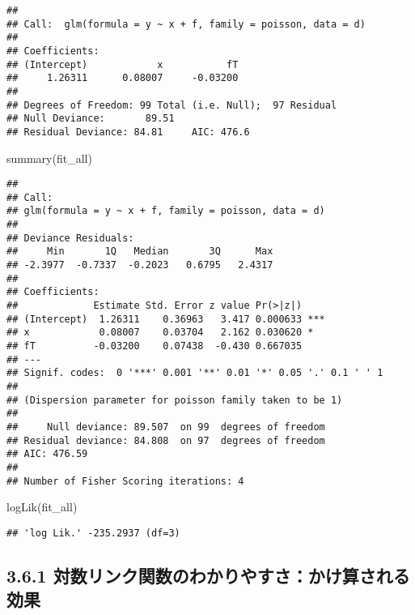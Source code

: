 \documentclass[
]{article}
\newenvironment{Shaded}{\begin{snugshade}}{\end{snugshade}}
\newcommand{\FunctionTok}[1]{\textcolor[rgb]{0.00,0.00,0.00}{#1}}
\newcommand{\NormalTok}[1]{#1}
\begin{document}
\begin{verbatim}
## 
## Call:  glm(formula = y ~ x + f, family = poisson, data = d)
## 
## Coefficients:
## (Intercept)            x           fT  
##     1.26311      0.08007     -0.03200  
## 
## Degrees of Freedom: 99 Total (i.e. Null);  97 Residual
## Null Deviance:       89.51 
## Residual Deviance: 84.81     AIC: 476.6
\end{verbatim}

\begin{Shaded}
\begin{Highlighting}[]
\FunctionTok{summary}\NormalTok{(fit\_all)}
\end{Highlighting}
\end{Shaded}

\begin{verbatim}
## 
## Call:
## glm(formula = y ~ x + f, family = poisson, data = d)
## 
## Deviance Residuals: 
##     Min       1Q   Median       3Q      Max  
## -2.3977  -0.7337  -0.2023   0.6795   2.4317  
## 
## Coefficients:
##             Estimate Std. Error z value Pr(>|z|)    
## (Intercept)  1.26311    0.36963   3.417 0.000633 ***
## x            0.08007    0.03704   2.162 0.030620 *  
## fT          -0.03200    0.07438  -0.430 0.667035    
## ---
## Signif. codes:  0 '***' 0.001 '**' 0.01 '*' 0.05 '.' 0.1 ' ' 1
## 
## (Dispersion parameter for poisson family taken to be 1)
## 
##     Null deviance: 89.507  on 99  degrees of freedom
## Residual deviance: 84.808  on 97  degrees of freedom
## AIC: 476.59
## 
## Number of Fisher Scoring iterations: 4
\end{verbatim}

\begin{Shaded}
\begin{Highlighting}[]
\FunctionTok{logLik}\NormalTok{(fit\_all)}
\end{Highlighting}
\end{Shaded}

\begin{verbatim}
## 'log Lik.' -235.2937 (df=3)
\end{verbatim}

\hypertarget{ux5bfeux6570ux30eaux30f3ux30afux95a2ux6570ux306eux308fux304bux308aux3084ux3059ux3055ux304bux3051ux7b97ux3055ux308cux308bux52b9ux679c}{%
\subsection{3.6.1
対数リンク関数のわかりやすさ：かけ算される効果}\label{ux5bfeux6570ux30eaux30f3ux30afux95a2ux6570ux306eux308fux304bux308aux3084ux3059ux3055ux304bux3051ux7b97ux3055ux308cux308bux52b9ux679c}}
\end{document}
